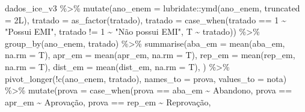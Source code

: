 \documentclass[
  letterpaper,
  DIV=11,
  numbers=noendperiod]{scrartcl}
\newenvironment{Shaded}{\begin{snugshade}}{\end{snugshade}}
\newcommand{\AttributeTok}[1]{\textcolor[rgb]{0.40,0.45,0.13}{#1}}
\newcommand{\DecValTok}[1]{\textcolor[rgb]{0.68,0.00,0.00}{#1}}
\newcommand{\FunctionTok}[1]{\textcolor[rgb]{0.28,0.35,0.67}{#1}}
\newcommand{\NormalTok}[1]{\textcolor[rgb]{0.00,0.23,0.31}{#1}}
\newcommand{\SpecialCharTok}[1]{\textcolor[rgb]{0.37,0.37,0.37}{#1}}
\newcommand{\StringTok}[1]{\textcolor[rgb]{0.13,0.47,0.30}{#1}}
\begin{document}
\begin{Shaded}
\begin{Highlighting}[]
\NormalTok{dados\_ice\_v3 }\SpecialCharTok{\%\textgreater{}\%} 
    \FunctionTok{mutate}\NormalTok{(}\AttributeTok{ano\_enem =}\NormalTok{ lubridate}\SpecialCharTok{::}\FunctionTok{ymd}\NormalTok{(ano\_enem, }\AttributeTok{truncated =} \DecValTok{2}\NormalTok{L),}
           \AttributeTok{tratado =} \FunctionTok{as\_factor}\NormalTok{(tratado),}
           \AttributeTok{tratado =} \FunctionTok{case\_when}\NormalTok{(tratado }\SpecialCharTok{==} \DecValTok{1} \SpecialCharTok{\textasciitilde{}} \StringTok{"Possui EMI"}\NormalTok{,}
\NormalTok{                               tratado }\SpecialCharTok{!=} \DecValTok{1} \SpecialCharTok{\textasciitilde{}} \StringTok{"Não possui EMI"}\NormalTok{,}
\NormalTok{                               T }\SpecialCharTok{\textasciitilde{}}\NormalTok{ tratado)) }\SpecialCharTok{\%\textgreater{}\%}
    \FunctionTok{group\_by}\NormalTok{(ano\_enem, tratado) }\SpecialCharTok{\%\textgreater{}\%} 
    \FunctionTok{summarise}\NormalTok{(}\AttributeTok{aba\_em =} \FunctionTok{mean}\NormalTok{(aba\_em, }\AttributeTok{na.rm =}\NormalTok{ T),}
              \AttributeTok{apr\_em =} \FunctionTok{mean}\NormalTok{(apr\_em, }\AttributeTok{na.rm =}\NormalTok{ T),}
              \AttributeTok{rep\_em =} \FunctionTok{mean}\NormalTok{(rep\_em, }\AttributeTok{na.rm =}\NormalTok{ T),}
              \AttributeTok{dist\_em =} \FunctionTok{mean}\NormalTok{(dist\_em, }\AttributeTok{na.rm =}\NormalTok{ T),}
\NormalTok{              ) }\SpecialCharTok{\%\textgreater{}\%}
  \FunctionTok{pivot\_longer}\NormalTok{(}\SpecialCharTok{!}\FunctionTok{c}\NormalTok{(ano\_enem, tratado), }
               \AttributeTok{names\_to =} \StringTok{\textquotesingle{}prova\textquotesingle{}}\NormalTok{,}
               \AttributeTok{values\_to =} \StringTok{\textquotesingle{}nota\textquotesingle{}}\NormalTok{) }\SpecialCharTok{\%\textgreater{}\%} 
  \FunctionTok{mutate}\NormalTok{(}\AttributeTok{prova =} \FunctionTok{case\_when}\NormalTok{(prova }\SpecialCharTok{==} \StringTok{\textquotesingle{}aba\_em\textquotesingle{}} \SpecialCharTok{\textasciitilde{}} \StringTok{\textquotesingle{}Abandono\textquotesingle{}}\NormalTok{,}
\NormalTok{                           prova }\SpecialCharTok{==} \StringTok{\textquotesingle{}apr\_em\textquotesingle{}} \SpecialCharTok{\textasciitilde{}} \StringTok{\textquotesingle{}Aprovação\textquotesingle{}}\NormalTok{,}
\NormalTok{                           prova }\SpecialCharTok{==} \StringTok{\textquotesingle{}rep\_em\textquotesingle{}} \SpecialCharTok{\textasciitilde{}} \StringTok{\textquotesingle{}Reprovação\textquotesingle{}}\NormalTok{,}

\end{Highlighting}
\end{Shaded}
\end{document}
